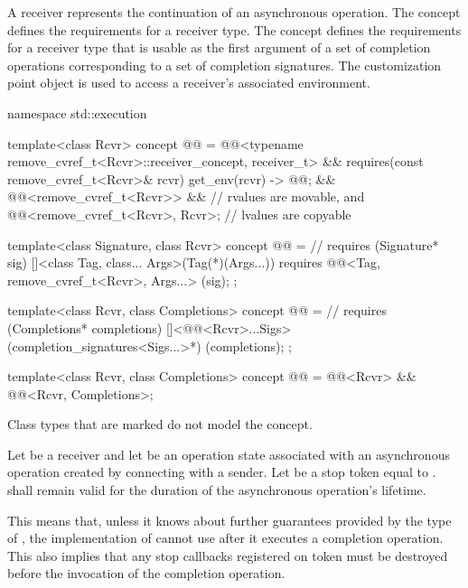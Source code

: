 \pnum
A receiver represents the continuation of an asynchronous operation.
The  concept defines
the requirements for a receiver type.
The  concept defines
the requirements for a receiver type that is usable as
the first argument of a set of completion operations
corresponding to a set of completion signatures.
The  customization point object is used to access
a receiver's associated environment.
\begin{codeblock}
namespace std::execution {
  template<class Rcvr>
    concept @@ =
      @@<typename remove_cvref_t<Rcvr>::receiver_concept, receiver_t> &&
      requires(const remove_cvref_t<Rcvr>& rcvr) {
        { get_env(rcvr) } -> @@;
      } &&
      @@<remove_cvref_t<Rcvr>> &&       // rvalues are movable, and
      @@<remove_cvref_t<Rcvr>, Rcvr>;   // lvalues are copyable

  template<class Signature, class Rcvr>
    concept @@ =                 // \expos
      requires (Signature* sig) {
        []<class Tag, class... Args>(Tag(*)(Args...))
            requires @@<Tag, remove_cvref_t<Rcvr>, Args...>
        {}(sig);
      };

  template<class Rcvr, class Completions>
    concept @@ =                      // \expos
      requires (Completions* completions) {
        []<@@<Rcvr>...Sigs>(completion_signatures<Sigs...>*)
        {}(completions);
      };

  template<class Rcvr, class Completions>
    concept @@ =
      @@<Rcvr> && @@<Rcvr, Completions>;
}
\end{codeblock}

\pnum
Class types that are marked  do not model the  concept.

\pnum
Let  be a receiver and
let  be an operation state associated with
an asynchronous operation created by connecting  with a sender.
Let  be a stop token equal to
.
 shall remain valid
for the duration of the asynchronous operation's lifetime.
\begin{note}
This means that, unless it knows about further guarantees
provided by the type of ,
the implementation of  cannot use 
after it executes a completion operation.
This also implies that any stop callbacks registered on token
must be destroyed before the invocation of the completion operation.
\end{note}

